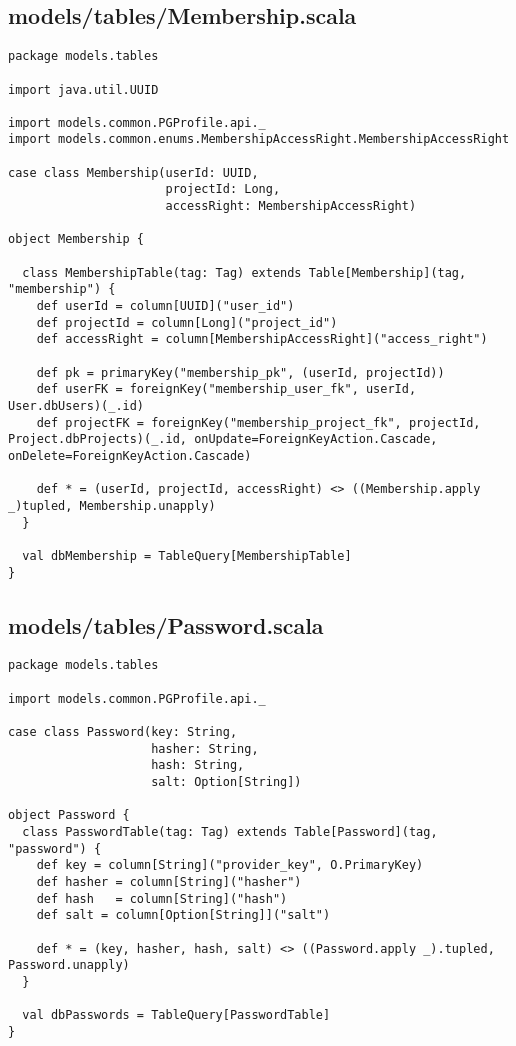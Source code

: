 \subsection{models/tables/Membership.scala}
\begin{lstlisting}
package models.tables

import java.util.UUID

import models.common.PGProfile.api._
import models.common.enums.MembershipAccessRight.MembershipAccessRight

case class Membership(userId: UUID,
                      projectId: Long,
                      accessRight: MembershipAccessRight)

object Membership {

  class MembershipTable(tag: Tag) extends Table[Membership](tag, "membership") {
    def userId = column[UUID]("user_id")
    def projectId = column[Long]("project_id")
    def accessRight = column[MembershipAccessRight]("access_right")

    def pk = primaryKey("membership_pk", (userId, projectId))
    def userFK = foreignKey("membership_user_fk", userId, User.dbUsers)(_.id)
    def projectFK = foreignKey("membership_project_fk", projectId, Project.dbProjects)(_.id, onUpdate=ForeignKeyAction.Cascade, onDelete=ForeignKeyAction.Cascade)

    def * = (userId, projectId, accessRight) <> ((Membership.apply _)tupled, Membership.unapply)
  }

  val dbMembership = TableQuery[MembershipTable]
}\end{lstlisting}
\subsection{models/tables/Password.scala}
\begin{lstlisting}
package models.tables

import models.common.PGProfile.api._

case class Password(key: String,
                    hasher: String,
                    hash: String,
                    salt: Option[String])

object Password {
  class PasswordTable(tag: Tag) extends Table[Password](tag, "password") {
    def key = column[String]("provider_key", O.PrimaryKey)
    def hasher = column[String]("hasher")
    def hash   = column[String]("hash")
    def salt = column[Option[String]]("salt")

    def * = (key, hasher, hash, salt) <> ((Password.apply _).tupled, Password.unapply)
  }

  val dbPasswords = TableQuery[PasswordTable]
}
\end{lstlisting}
